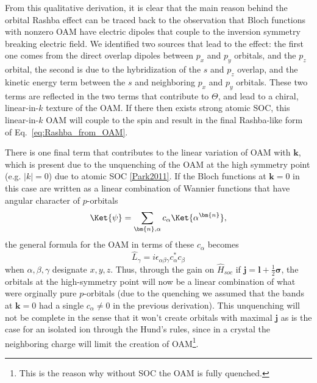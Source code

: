 From this qualitative derivation, it is clear that the main reason behind the orbital Rashba effect can be traced back to the observation that Bloch functions with nonzero OAM have electric dipoles that couple to the inversion symmetry breaking electric field. We identified two sources that lead to the effect: the first one comes from the direct overlap dipoles between $p_x$ and $p_y$ orbitals, and the $p_z$ orbital\cite{Petersen2000}, the second is due to the hybridization of the $s$ and $p_z$ overlap, and the kinetic energy term between the $s$ and neighboring $p_x$ and $p_y$ orbitals\cite{Go2016}. These two terms are reflected in the two terms that contribute to $\Theta$, and lead to a chiral, linear-in-$k$ texture of the OAM.
If there then exists strong atomic SOC, this linear-in-$k$ OAM will couple to the spin and result in the final Rashba-like form of Eq.~\ref{eq:Rashba_from_OAM}.


There is one final term that contributes to the linear variation of OAM with $\bm{k}$, which is present due to the unquenching of the OAM at the high symmetry point (e.g. $|k|=0$) due to atomic SOC \ref{Park2011}.
If the Bloch functions at $\bm{k}=0$ in this case are written as a linear combination of Wannier functions that have angular character of $p$-orbitals
\begin{equation}
\Ket{\psi} = \sum_{\bm{n},\alpha} c_\alpha \Ket{\alpha^{\bm{n}}},
\end{equation}
the general formula for the OAM in terms of these $c_\alpha$ becomes
\begin{equation}
	\hat{L}_{\gamma}= i \epsilon_{\alpha \beta \gamma} c^*_\alpha c_\beta
\end{equation}
when $\alpha,\beta,\gamma$ designate $x,y,z$.
Thus, through the gain on $\hat{H}_{soc}$ if $\bm{j} = \bm{l} + \frac{1}{2}\bm{\sigma}$, the orbitals at the high-symmetry point will now be a linear combination of what were orginally pure $p$-orbitals (due to the quenching we assumed that the bands at $\bm{k}=0$ had a single $c_\alpha \neq 0$ in the previous derivation).
This unquenching will not be complete in the sense that it won't create orbitals with maximal $\bm{j}$ as is the case for an isolated ion through the Hund's rules, since in a crystal the neighboring charge will limit the creation of OAM\footnote{This is the reason why without SOC the OAM is fully quenched.}.


